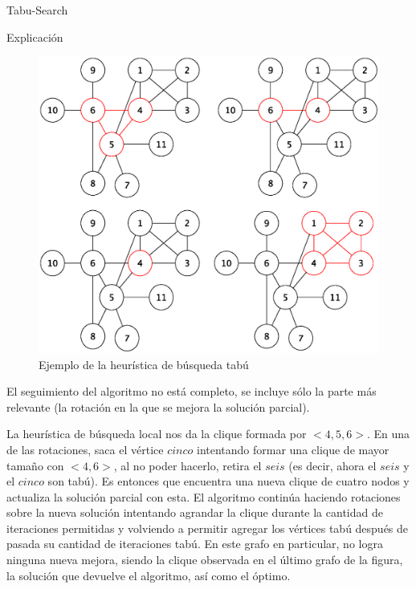 \begin{section}{Tabu-Search}
\begin{subsection}{Explicación}
			\begin{figure}[H]
				\centering
		    	\includegraphics[scale=0.5]{tabu_search/seguimiento.eps}
			    \caption{Ejemplo de la heurística de búsqueda tabú}
			    \label{fig:seguimiento_busqueda_tabu}
			\end{figure}

		El seguimiento del algoritmo no está completo, se incluye sólo la parte más relevante (la rotación en la que se mejora la solución parcial).

		La heurística de búsqueda local nos da la clique formada por $<4,5,6>$. En una de las rotaciones, saca el vértice $cinco$ intentando formar una clique de mayor tamaño con $<4,6>$, al no poder hacerlo, retira el $seis$ (es decir, ahora el $seis$ y el $cinco$ son tabú). Es entonces que encuentra una nueva clique de cuatro nodos y actualiza la solución parcial con esta. El algoritmo continúa haciendo rotaciones sobre la nueva solución intentando agrandar la clique durante la cantidad de iteraciones permitidas y volviendo a permitir agregar los vértices tabú después de pasada su cantidad de iteraciones tabú. En este grafo en particular, no logra ninguna nueva mejora, siendo la clique observada en el último grafo de la figura, la solución que devuelve el algoritmo, así como el óptimo.

\end{subsection}
\end{section}
